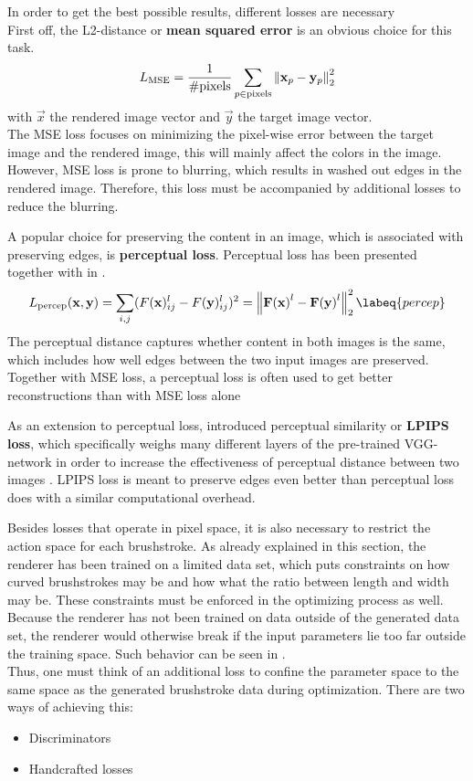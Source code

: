In order to get the best possible results, different losses are necessary\\
First off, the L2-distance or \textbf{mean squared error} is an obvious choice for this task.
\begin{align}
    L_{\text{MSE}} = \frac{1}{\# \text{pixels}} \sum_{p \in \text{pixels}} \left\lVert\mathbf{x}_p - \mathbf{y}_p\right\rVert_2^2
\end{align}
with $\vec{x}$ the rendered image vector and $\vec{y}$ the target image vector.\\
The MSE loss focuses on minimizing the pixel-wise error between the target image and the rendered image, this will mainly affect the colors in the image.
However, MSE loss is prone to blurring, which results in washed out edges in the rendered image.
Therefore, this loss must be accompanied by additional losses to reduce the blurring.

A popular choice for preserving the content in an image, which is associated with preserving edges, is \textbf{perceptual loss}.
Perceptual loss has been presented together with  in .
\begin{align}
    L_{\text{percep}}(\vec{x}, \vec{y}) = \sum_{i, j} (F(\vec{x})_{ij}^l - F(\vec{y})_{ij}^l)^2 = \norm{\tensor{F(\vec{x})}^l - \tensor{F(\vec{y})}^l}_2^2
    \labeq{percep}
\end{align}
The perceptual distance captures whether content in both images is the same, which includes how well edges between the two input images are preserved.
Together with MSE loss, a perceptual loss is often used to get better reconstructions than with MSE loss alone

As an extension to perceptual loss, \citeauthor*{LPIPS} introduced perceptual similarity or \textbf{LPIPS loss}, which specifically weighs many different layers of the pre-trained VGG-network in order to increase the effectiveness of perceptual distance between two images \cite{LPIPS}.
LPIPS loss is meant to preserve edges even better than perceptual loss does with a similar computational overhead.

Besides losses that operate in pixel space, it is also necessary to restrict the action space for each brushstroke.
As already explained in this section, the renderer has been trained on a limited data set, which puts constraints on how curved brushstrokes may be and how what the ratio between length and width may be.
These constraints must be enforced in the optimizing process as well.\\
Because the renderer has not been trained on data outside of the generated data set, the renderer would otherwise break if the input parameters lie too far outside the training space.
Such behavior can be seen in .\\
Thus, one must think of an additional loss to confine the parameter space to the same space as the generated brushstroke data during optimization.
There are two ways of achieving this:
\begin{itemize}
    \item Discriminators
    \item Handcrafted losses
\end{itemize}

